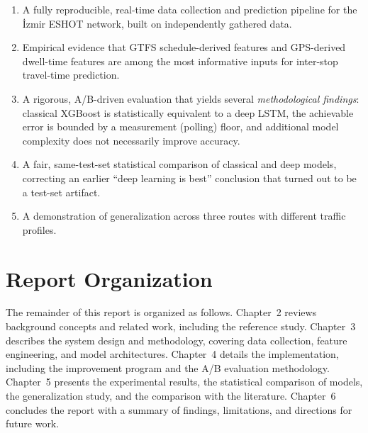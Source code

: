 \begin{enumerate}
    \item A fully reproducible, real-time data collection and prediction pipeline for the İzmir ESHOT network, built on independently gathered data.
    \item Empirical evidence that GTFS schedule-derived features and GPS-derived dwell-time features are among the most informative inputs for inter-stop travel-time prediction.
    \item A rigorous, A/B-driven evaluation that yields several \emph{methodological findings}: classical XGBoost is statistically equivalent to a deep LSTM, the achievable error is bounded by a measurement (polling) floor, and additional model complexity does not necessarily improve accuracy.
    \item A fair, same-test-set statistical comparison of classical and deep models, correcting an earlier ``deep learning is best'' conclusion that turned out to be a test-set artifact.
    \item A demonstration of generalization across three routes with different traffic profiles.
\end{enumerate}

\section{Report Organization}

The remainder of this report is organized as follows. Chapter~2 reviews background concepts and related work, including the reference study. Chapter~3 describes the system design and methodology, covering data collection, feature engineering, and model architectures. Chapter~4 details the implementation, including the improvement program and the A/B evaluation methodology. Chapter~5 presents the experimental results, the statistical comparison of models, the generalization study, and the comparison with the literature. Chapter~6 concludes the report with a summary of findings, limitations, and directions for future work.
